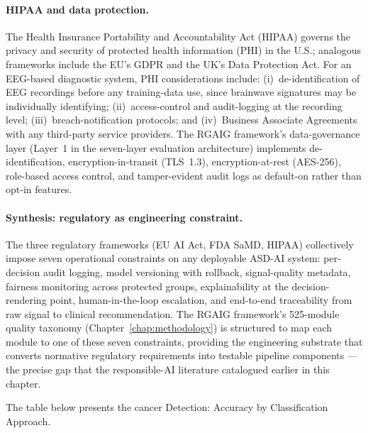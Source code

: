 \paragraph{HIPAA and data protection.}
The Health Insurance Portability and Accountability Act (HIPAA) governs the privacy and security of protected health information (PHI) in the U.S.; analogous frameworks include the EU's GDPR and the UK's Data Protection Act. For an EEG-based diagnostic system, PHI considerations include: (i)~de-identification of EEG recordings before any training-data use, since brainwave signatures may be individually identifying; (ii)~access-control and audit-logging at the recording level; (iii)~breach-notification protocols; and (iv)~Business Associate Agreements with any third-party service providers. The RGAIG framework's data-governance layer (Layer~1 in the seven-layer evaluation architecture) implements de-identification, encryption-in-transit (TLS~1.3), encryption-at-rest (AES-256), role-based access control, and tamper-evident audit logs as default-on rather than opt-in features.

\paragraph{Synthesis: regulatory as engineering constraint.}
The three regulatory frameworks (EU AI Act, FDA SaMD, HIPAA) collectively impose seven operational constraints on any deployable ASD-AI system: per-decision audit logging, model versioning with rollback, signal-quality metadata, fairness monitoring across protected groups, explainability at the decision-rendering point, human-in-the-loop escalation, and end-to-end traceability from raw signal to clinical recommendation. The RGAIG framework's 525-module quality taxonomy (Chapter~\ref{chap:methodology}) is structured to map each module to one of these seven constraints, providing the engineering substrate that converts normative regulatory requirements into testable pipeline components --- the precise gap that the responsible-AI literature catalogued earlier in this chapter.

\iffalse %
\noindent The table below presents the cancer Detection: Accuracy by Classification Approach.

